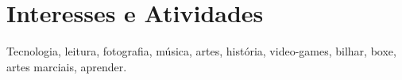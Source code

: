 \documentclass[a4paper,10pt]{article} %
\begin{document}

\section{Interesses e Atividades}

Tecnologia, leitura, fotografia, música, artes,
história, video-games, bilhar, boxe, artes marciais, aprender.

\end{document}
